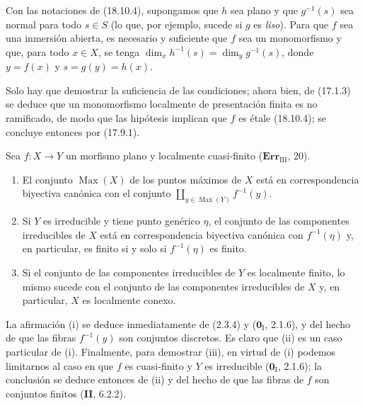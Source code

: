 \begin{corollary}[18.10.5]
\label{IV.18.10.5}
Con las notaciones de \textup{(18.10.4)}, supongamos que $h$ sea plano y que $g^{-1}(s)$ sea normal para todo $s\in S$ \textup{(lo que, por ejemplo, sucede si $g$ es \emph{liso})}. Para que $f$ sea una inmersión abierta, es necesario y suficiente que $f$ sea un monomorfismo y que, para todo $x\in X$, se tenga $\dim_xh^{-1}(s)=\dim_yg^{-1}(s)$, donde $y=f(x)$ y $s=g(y)=h(x)$.
\end{corollary}

Solo hay que demostrar la suficiencia de las condiciones; ahora bien, de (17.1.3) se deduce que un monomorfismo localmente de presentación finita es no ramificado, de modo que las hipótesis implican que $f$ es étale (18.10.4); se concluye entonces por (17.9.1).

\begin{lemma}[18.10.6]
\label{IV.18.10.6}
Sea $f:X\to Y$ un morfismo plano y localmente cuasi-finito \textup{($\mathbf{Err}_{\mathrm{III}}$, 20)}.
\begin{enumerate}
  \item[\textup{(i)}] El conjunto $\operatorname{Max}(X)$ de los puntos máximos de $X$ está en correspondencia biyectiva canónica con el conjunto $\coprod_{y\in\operatorname{Max}(Y)}f^{-1}(y)$.
  \item[\textup{(ii)}] Si $Y$ es irreducible y tiene punto genérico $\eta$, el conjunto de las componentes irreducibles de $X$ está en correspondencia biyectiva canónica con $f^{-1}(\eta)$ y, en particular, es finito si y solo si $f^{-1}(\eta)$ es finito.


  \item[\textup{(iii)}] Si el conjunto de las componentes irreducibles de $Y$ es localmente finito, lo mismo sucede con el conjunto de las componentes irreducibles de $X$ y, en particular, $X$ es localmente conexo.
\end{enumerate}
\end{lemma}

La afirmación (i) se deduce inmediatamente de (2.3.4) y ($\mathbf 0_{\mathrm I}$, 2.1.6), y del hecho de que las fibras $f^{-1}(y)$ son conjuntos discretos. Es claro que (ii) es un caso particular de (i). Finalmente, para demostrar (iii), en virtud de (i) podemos limitarnos al caso en que $f$ es cuasi-finito y $Y$ es irreducible ($\mathbf 0_{\mathrm I}$, 2.1.6); la conclusión se deduce entonces de (ii) y del hecho de que las fibras de $f$ son conjuntos finitos (\textbf{II}, 6.2.2).

